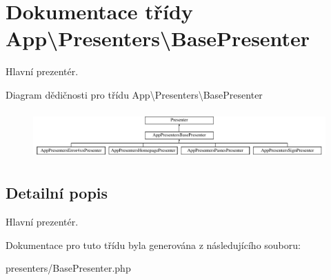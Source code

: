 \hypertarget{classApp_1_1Presenters_1_1BasePresenter}{\section{Dokumentace třídy App\textbackslash{}Presenters\textbackslash{}Base\-Presenter}
\label{classApp_1_1Presenters_1_1BasePresenter}
}


Hlavní prezentér.  


Diagram dědičnosti pro třídu App\textbackslash{}Presenters\textbackslash{}Base\-Presenter\begin{figure}[H]
\begin{center}
\leavevmode
\includegraphics[height=1.850220cm]{classApp_1_1Presenters_1_1BasePresenter}
\end{center}
\end{figure}


\subsection{Detailní popis}
Hlavní prezentér. 

Dokumentace pro tuto třídu byla generována z následujícího souboru\-:\begin{DoxyCompactItemize}
\item 
presenters/Base\-Presenter.\-php\end{DoxyCompactItemize}
